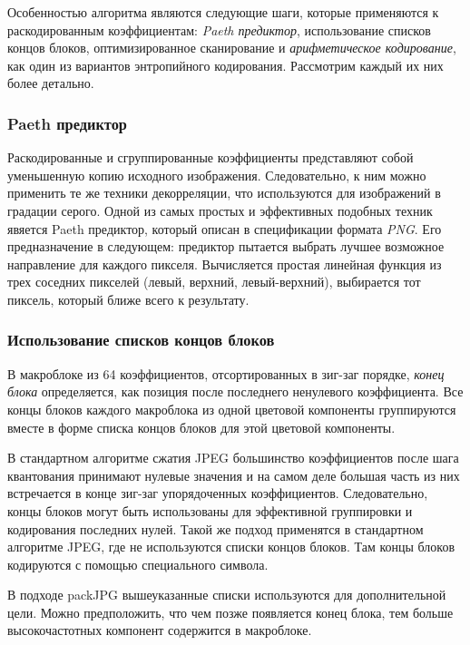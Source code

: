 \documentclass{matmex-diploma-custom}
\begin{document}
Особенностью алгоритма являются следующие шаги, которые применяются к раскодированным коэффициентам:
\emph{Paeth предиктор}\cite{png-spec}, использование списков концов блоков, оптимизированное сканирование и \emph{арифметическое кодирование}\cite{ariph-coding}, как один из вариантов энтропийного кодирования. Рассмотрим каждый их них более детально.

\subsubsection{Paeth предиктор}

Раскодированные и сгруппированные коэффициенты представляют собой уменьшенную копию исходного изображения. Следовательно, к ним  можно применить те же техники декорреляции, что используются для изображений в градации серого.
Одной из самых простых и эффективных подобных техник явяется Paeth предиктор, который описан в спецификации формата \emph{PNG}\cite{png-spec}. Его предназначение в следующем: предиктор пытается выбрать лучшее возможное направление для каждого пикселя. Вычисляется простая линейная функция из трех соседних пикселей (левый, верхний, левый-верхний), выбирается тот пиксель, который ближе всего к результату.

\subsubsection{Использование списков концов блоков}
В макроблоке из 64 коэффициентов, отсортированных в зиг-заг порядке, \emph{конец блока} определяется, как позиция после последнего ненулевого коэффициента. Все концы блоков каждого макроблока из одной цветовой компоненты группируются вместе в форме списка концов блоков для этой цветовой компоненты.

В стандартном алгоритме сжатия JPEG большинство коэффициентов после шага квантования принимают нулевые значения и на самом деле большая часть из них встречается в конце зиг-заг упорядоченных коэффициентов. Следовательно, концы блоков могут быть использованы для эффективной группировки и кодирования последних нулей. Такой же подход применятся в стандартном алгоритме JPEG, где не используются списки концов блоков. Там концы блоков кодируются с помощью специального символа.

В подходе packJPG вышеуказанные списки используются для дополнительной цели. Можно предположить, что чем позже появляется конец блока, тем больше высокочастотных компонент содержится в макроблоке.
\end{document}
